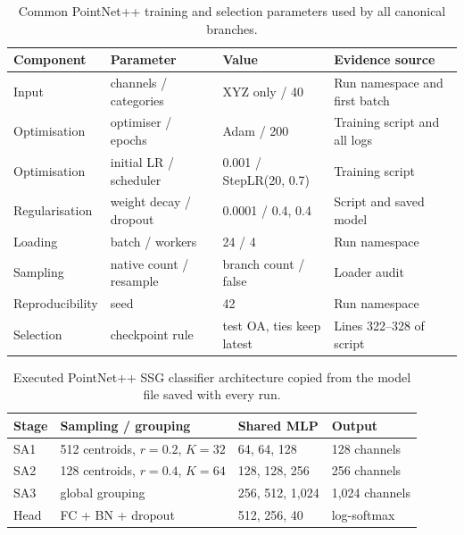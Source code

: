\begin{table}[htbp]
\centering
\small
\begin{tabularx}{\linewidth}{lllX}
\toprule
Component & Parameter & Value & Evidence source \\
\midrule
Input & channels / categories & XYZ only / 40 & Run namespace and first batch \\
Optimisation & optimiser / epochs & Adam / 200 & Training script and all logs \\
Optimisation & initial LR / scheduler & 0.001 / StepLR(20, 0.7) & Training script \\
Regularisation & weight decay / dropout & 0.0001 / 0.4, 0.4 & Script and saved model \\
Loading & batch / workers & 24 / 4 & Run namespace \\
Sampling & native count / resample & branch count / false & Loader audit \\
Reproducibility & seed & 42 & Run namespace \\
Selection & checkpoint rule & test OA, ties keep latest & Lines 322--328 of script \\
\bottomrule
\end{tabularx}
\caption{Common PointNet++ training and selection parameters used by all canonical branches.}
\label{tab:classifier-parameters}
\end{table}

\begin{table}[htbp]
\centering
\small
\begin{tabular}{llll}
\toprule
Stage & Sampling / grouping & Shared MLP & Output \\
\midrule
SA1 & 512 centroids, $r=0.2$, $K=32$ & 64, 64, 128 & 128 channels \\
SA2 & 128 centroids, $r=0.4$, $K=64$ & 128, 128, 256 & 256 channels \\
SA3 & global grouping & 256, 512, 1,024 & 1,024 channels \\
Head & FC + BN + dropout & 512, 256, 40 & log-softmax \\
\bottomrule
\end{tabular}
\caption{Executed PointNet++ SSG classifier architecture copied from the model file saved with every run.}
\label{tab:pointnet-architecture}
\end{table}

